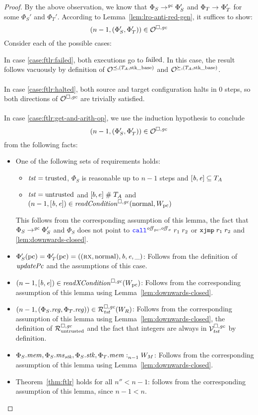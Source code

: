 \begin{proof}
  By the above observation, we know that $\Phi_S \step[\gc] \Phi_S'$ and $\Phi_T \step
  \Phi_T'$ for some $\Phi_S'$ and $\Phi_T'$.
  According to Lemma~\ref{lem:lro-anti-red-gen}, it suffices to show:
  \[
    \npair[n-1]{(\Phi_S',\Phi_T')} \in \lro
  \]
  Consider each of the possible cases:

  In case \ref{case:ftlr:failed}, both executions go to $\failed$.
  In this case, the result follows vacuously by definition of $\lrol$ and $\lror$.
  \\\\
  In case \ref{case:ftlr:halted}, both source and target configuration halts in 0
  steps, so both directions of $\lro$ are trivially satisfied.
  \\\\
  In case \ref{case:ftlr:get-and-arith-op}, we use the induction hypothesis to conclude
  \[
    \npair[n-1]{(\Phi_S',\Phi_T')} \in \lro
  \]
  from the following facts:
  \begin{itemize}
  \item One of the following sets of requirements holds:
    \begin{itemize}
    \item $\trust = \trusted$, $\Phi_S$ is reasonable up to $n-1$ steps and $[\baddr,\eaddr] \subseteq \ta$
    \item $\trust = \untrusted$ and $[b,e] \mathrel{\#} \ta$ and $\npair[n-1]{[\baddr,\eaddr]} \in \readCond{\normal,W_\pcreg}$
    \end{itemize}
    This follows from the corresponding assumption of this lemma, the fact that $\Phi_S \step[\gc] \Phi_S'$ and $\Phi_S$ does not point to $\scall{\offpc,\offsigma}{r_1}{r_2}$ or $\txjmp{r_1}{r_2}$ and \ref{lem:downwards-closed}.
  \item $\Phi_S'(\pcreg) = \Phi_T'(\pcreg) = ((\rx,\normal),\baddr,\eaddr,\_)$:
    Follows from the definition of $\updPcAddr{}$ and the assumptions of this case.
  \item $\npair[n-1]{[\baddr,\eaddr]} \in \xReadCond{W_\pcreg}$:
    Follows from the corresponding assumption of this lemma using Lemma~\ref{lem:downwards-closed}.
  \item $\npair[n-1]{(\Phi_S.\reg,\Phi_T.\reg)} \in \lrrg{\trust}(W_R)$:
    Follows from the corresponding assumption of this lemma using Lemma~\ref{lem:downwards-closed}, the definition of $\lrr$ and the fact that integers are always in $\lrvg{\trust}$ by definition.
  \item $\memSat[n-1]{\Phi_S.\mem,\Phi_S.\ms_\stk,\Phi_S.\stk,\Phi_T.\mem}{W_M}$:
    Follows from the corresponding assumption of this lemma using Lemma~\ref{lem:downwards-closed}.
  \item Theorem~\ref{thm:ftlr} holds for all $n'' < n-1$:
    follows from the corresponding assumption of this lemma, since $n - 1 < n$.
  \end{itemize}


\end{proof}
